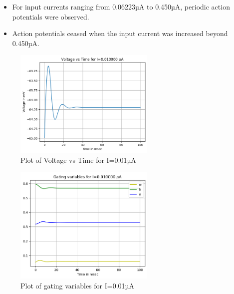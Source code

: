 \documentclass[12pt,a4paper]{report}
\begin{document}
\begin{itemize}
  \item For input currents ranging from 0.06223µA to 0.450µA, periodic action potentials were observed.
\end{itemize}

\begin{itemize}
  \item Action potentials ceased when the input current was increased beyond 0.450µA.
\end{itemize}

\begin{figure}[H]
    \centering
    \includegraphics[width=0.6\textwidth]{./data/voltage_time_0_01uA.png}
    \caption{Plot of Voltage vs Time for I=0.01µA}
    \label{fig:voltage_time_0_01uA}
\end{figure}

\begin{figure}[H]
    \centering
    \includegraphics[width=0.6\textwidth]{./data/gating_variables_0_01uA.png}
    \caption{Plot of gating variables for I=0.01µA}
    \label{fig:gating_variables_0_01uA}
\end{figure}
\end{document}
